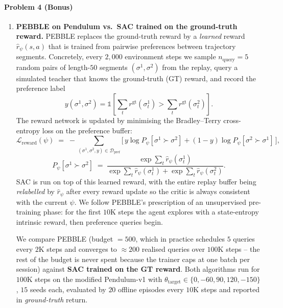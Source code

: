 \documentclass[12pt]{scrartcl}
\begin{document}
\paragraph*{Problem 4 (Bonus)}
\begin{enumerate}
    \item \textbf{PEBBLE on Pendulum vs.\ SAC trained on the ground-truth reward.}
    PEBBLE replaces the ground-truth reward by a \emph{learned} reward $\hat r_\psi(s,a)$ that is trained from pairwise preferences between trajectory segments. Concretely, every $2{,}000$ environment steps we sample $n_{\text{query}}=5$ random pairs of length-$50$ segments $(\sigma^1,\sigma^2)$ from the replay, query a simulated teacher that knows the ground-truth (GT) reward, and record the preference label
    \[
        y(\sigma^1,\sigma^2) = \mathbb{1}\!\left[\textstyle\sum_t r^{\text{gt}}(\sigma^1_t) > \sum_t r^{\text{gt}}(\sigma^2_t)\right].
    \]
    The reward network is updated by minimising the Bradley--Terry cross-entropy loss on the preference buffer:
    \[
      \mathcal{L}_{\text{reward}}(\psi) \;=\; -\!\!\!\sum_{(\sigma^1,\sigma^2,y)\in\mathcal{D}_{\text{pref}}}\!\!\Big[\, y\log P_\psi[\sigma^1\!\succ\!\sigma^2] + (1-y)\log P_\psi[\sigma^2\!\succ\!\sigma^1]\,\Big],
    \]
    \[
      P_\psi[\sigma^1\!\succ\!\sigma^2] \;=\; \frac{\exp\!\sum_t \hat r_\psi(\sigma^1_t)}{\exp\!\sum_t \hat r_\psi(\sigma^1_t) + \exp\!\sum_t \hat r_\psi(\sigma^2_t)}.
    \]
    SAC is run on top of this learned reward, with the entire replay buffer being \emph{relabelled} by $\hat r_\psi$ after every reward update so the critic is always consistent with the current $\psi$. We follow PEBBLE's prescription of an unsupervised pre-training phase: for the first $10$K steps the agent explores with a state-entropy intrinsic reward, then preference queries begin.

    We compare PEBBLE (budget $=500$, which in practice schedules $5$ queries every $2$K steps and converges to $\approx 200$ realised queries over $100$K steps -- the rest of the budget is never spent because the trainer caps at one batch per session) against \textbf{SAC trained on the GT reward}. Both algorithms run for $100$K steps on the modified Pendulum-v1 with $\theta_{\text{target}}\in\{0,-60,90,120,-150\}$, $15$ seeds each, evaluated by $20$ offline episodes every $10$K steps and reported in \emph{ground-truth} return.


\end{enumerate}
\end{document}
